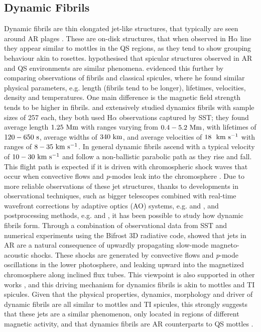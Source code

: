 \subsection{Dynamic Fibrils}
\label{subsec:dfibs}
Dynamic fibrils are thin elongated jet-like structures, that typically are seen around AR plages \citep{Hansteen2006ApJ,De_Pontieu2007ApJ}. These are on-disk structures, that when observed in H$\alpha$ line they appear similar to mottles in the QS regions, as they tend to show grouping behaviour akin to rosettes. \cite{Foukal1971SoPh20298F} hypothesised that spicular structures observed in AR and QS environments are similar phenomena. \citep{Foukal1971SoPh1959F} evidenced this further by comparing observations of fibrils and classical spicules, where he found similar physical parameters, e.g. length (fibrils tend to be longer), lifetimes, velocities, density and temperatures. One main difference is the magnetic field strength tends to be higher in fibrils. \cite{Hansteen2006ApJ} and \cite{De_Pontieu2007ApJ} extensively studied dynamics fibrils with sample sizes of 257 each, they both used H$\alpha$ observations captured by SST; they found average length $1.25~\rm{Mm}$ with ranges varying from $0.4-5.2~\rm{Mm}$, with lifetimes of $120-650~\rm{s}$, average widths of $340~\rm{km}$, and average velocities of $18~~\rm{km ~s^{-1}}$ with ranges of $8-35~\rm{km ~s^{-1}}$. In general dynamic fibrils ascend with a typical velocity of $10-30~\rm{km ~s^{-1}}$ and follow a non-ballistic parabolic path as they rise and fall. This flight path is expected if it is driven with chromospheric shock waves that occur when convective flows and \textit{p}-modes leak into the chromosphere \citep{Hansteen2006ApJ,De_Pontieu2007ApJ,Langangen2008ApJ6731194L}. \np
%
Due to more reliable observations of these jet structures, thanks to developments in observational techniques, such as bigger telescopes combined with real-time wavefront corrections by adaptive optics (AO) systems, e.g. \cite{Scharmer2003SPIE4853370S} and \cite{Rimmele2000SPIE4007218R}, and postprocessing methods, e.g. \cite{van2005SoPh228191V} and \cite{von1993AA268374V}, it has been possible to study how dynamic fibrils form. Through a combination of observational data from SST and numerical experiments using the Bifrost 3D radiative code, \cite{Hansteen2006ApJ} showed that jets in AR are a natural consequence of upwardly propagating slow-mode magneto-acoustic shocks. These shocks are generated by convective flows and \textit{p}-mode oscillations in the lower photosphere, and leaking upward into the magnetized chromosphere along inclined flux tubes. This viewpoint is also supported in other works \citep{Heggland2007ApJ6661277H,De_Pontieu2007ApJ,Pontieu2004Natur,Suematsu1990LNP367211S}, and this driving mechanism for dynamics fibrils is akin to mottles and TI spicules. Given that the physical properties, dynamics, morphology and driver of dynamic fibrils are all similar to mottles and TI spicules, this strongly suggests that these jets are a similar phenomenon, only located in regions of different magnetic activity, and that dynamics fibrils are AR counterparts to QS mottles \citep{Rouppe2007ApJ660L169R}.
